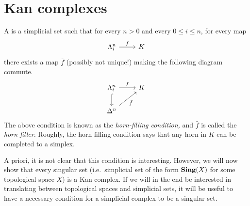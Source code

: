 \documentclass[main.tex]{subfiles}
\begin{document}
\section{Kan complexes}
\label{sec:kan_complexes}

\begin{definition}
  \label{def:kan_complex}
  A  is a simplicial set such that for every $n > 0$ and every $0 \leq i \leq n$, for every map
  \begin{equation*}
    \begin{tikzcd}
      \Lambda^{n}_{i}
      \arrow[r, "f"]
      & K
    \end{tikzcd}
  \end{equation*}
  there exists a map $\bar{f}$ (possibly not unique!) making the following diagram commute.
  \begin{equation*}
    \begin{tikzcd}
      \Lambda^{n}_{i}
      \arrow[r, "f"]
      \arrow[d, hookrightarrow]
      & K
      \\
      \Delta^{n}
      \arrow[ur, swap, "\bar{f}"]
    \end{tikzcd}
  \end{equation*}
  The above condition is known as the \emph{horn-filling condition,} and $\bar{f}$ is called the \emph{horn filler.} Roughly, the horn-filling condition says that any horn in $K$ can be completed to a simplex.
\end{definition}

A priori, it is not clear that this condition is interesting. However, we will now show that every singular set (i.e.\ simplicial set of the form $\mathbf{Sing}(X)$ for some topological space $X$) is a Kan complex. If we will in the end be interested in translating between topological spaces and simplicial sets, it will be useful to have a necessary condition for a simplicial complex to be a singular set.
\end{document}
